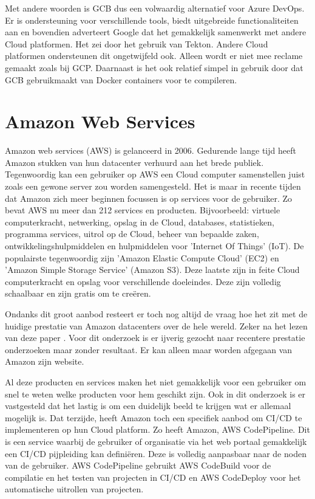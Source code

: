 Met andere woorden is GCB dus een volwaardig alternatief voor Azure DevOps. Er is ondersteuning voor verschillende tools, biedt uitgebreide functionaliteiten aan en bovendien adverteert Google dat het gemakkelijk samenwerkt met andere Cloud platformen. Het zei door het gebruik van Tekton. Andere Cloud platformen ondersteunen dit ongetwijfeld ook. Alleen wordt er niet mee reclame gemaakt zoals bij GCP. Daarnaast is het ook relatief simpel in gebruik door dat GCB gebruikmaakt van Docker containers voor te compileren.

\section{Amazon Web Services}
\label{sec:amazonaws}
Amazon web services (AWS) is gelanceerd in 2006. Gedurende lange tijd heeft Amazon stukken van hun datacenter verhuurd aan het brede publiek. Tegenwoordig kan een gebruiker op AWS een Cloud computer samenstellen juist zoals een gewone server zou worden samengesteld. Het is maar in recente tijden dat Amazon zich meer beginnen focussen is op services voor de gebruiker. Zo bevat AWS nu meer dan 212 services en producten. Bijvoorbeeld: virtuele computerkracht, netwerking, opslag in de Cloud, databases, statistieken, programma services, uitrol op de Cloud, beheer van bepaalde zaken, ontwikkelingshulpmiddelen en hulpmiddelen voor 'Internet Of Things' (IoT). De populairste tegenwoordig zijn 'Amazon Elastic Compute Cloud' (EC2) en 'Amazon Simple Storage Service' (Amazon S3). Deze laatste zijn in feite Cloud computerkracht en opslag voor verschillende doeleindes. Deze zijn volledig schaalbaar en zijn gratis om te creëren.

Ondanks dit groot aanbod resteert er toch nog altijd de vraag hoe het zit met de huidige prestatie van Amazon datacenters over de hele wereld. Zeker na het lezen van deze paper \autocite{Jackson2010}. Voor dit onderzoek is er ijverig gezocht naar recentere prestatie onderzoeken maar zonder resultaat. Er kan alleen maar worden afgegaan van Amazon zijn website.

Al deze producten en services maken het niet gemakkelijk voor een gebruiker om snel te weten welke producten voor hem geschikt zijn. Ook in dit onderzoek is er vastgesteld dat het lastig is om een duidelijk beeld te krijgen wat er allemaal mogelijk is. Dat terzijde, heeft Amazon toch een specifiek aanbod om CI/CD te implementeren op hun Cloud platform. Zo heeft Amazon, AWS CodePipeline. Dit is een service waarbij de gebruiker of organisatie via het web portaal gemakkelijk een CI/CD pijpleiding kan definiëren. Deze is volledig aanpasbaar naar de noden van de gebruiker. AWS CodePipeline gebruikt AWS CodeBuild voor de compilatie en het testen van projecten in CI/CD en AWS CodeDeploy voor het automatische uitrollen van projecten.

